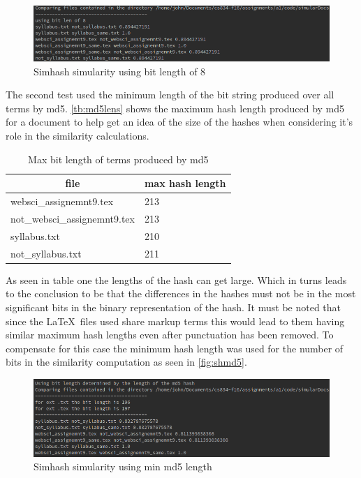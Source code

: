 \documentclass[11pt]{article}
\begin{document}
\begin{figure}[h]
\centering
	\includegraphics[scale=0.6]{simhashB8.png}
	\caption{Simhash simularity using bit length of 8} \label{fig:shb8}
\end{figure}\newline
The second test used the minimum length of the bit string produced over all terms by md5. \autoref{tb:md5lens} shows the maximum hash length produced by md5 for a document to help get an idea of the size of the hashes when considering it's role in the similarity calculations.
\begin{table}[h]
\centering
\begin{tabular}{|l|l|}
\hline
\multicolumn{1}{|c|}{file} & \multicolumn{1}{c|}{max hash length} \\ \hline
websci\_assignemnt9.tex & 213 \\ \hline
not\_websci\_assignemnt9.tex & 213 \\ \hline
syllabus.txt & 210 \\ \hline
not\_syllabus.txt & 211 \\ \hline
\end{tabular}
\caption{Max bit length of terms produced by md5}
\label{tb:md5lens}
\end{table}\newline
As seen in table one the lengths of the hash can get large. Which in turns leads to the conclusion to be that the differences in the hashes must not be in the most significant bits in the binary representation of the hash. It must be noted that since the \LaTeX \ files used share markup terms this would lead to them having similar maximum hash lengths even after punctuation has been removed. To compensate for this case the minimum hash length was used for the number of bits in the similarity computation as seen in  \autoref{fig:shmd5}.
\begin{figure}[h]
\centering
	\includegraphics[scale=0.6]{simhashMD5.png}
	\caption{Simhash simularity using min md5 length} \label{fig:shmd5}
\end{figure}\newline
\end{document}
